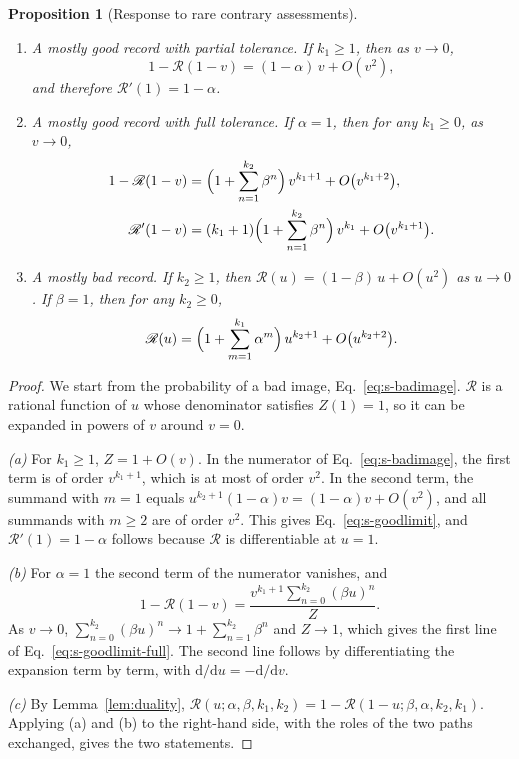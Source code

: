 \documentclass[10pt]{wlscirep}
\newcommand{\Rmap}{\mathscr{R}}            %
\newcommand{\dd}{\mathrm{d}}
\theoremstyle{plain}
\newtheorem{proposition}[lemma]{Proposition}
\theoremstyle{remark}
\begin{document}
\begin{proposition}[Response to rare contrary assessments]\label{prop:properties}
\begin{enumerate}
\item[(a)] \textit{A mostly good record with partial tolerance.} If $k_1\geq1$, then as $v\to0$,
\begin{equation}
1-\Rmap(1-v)=(1-\alpha)\,v+O(v^2),
\label{eq:s-goodlimit}
\end{equation}
and therefore $\Rmap'(1)=1-\alpha$.
\item[(b)] \textit{A mostly good record with full tolerance.} If $\alpha=1$, then for any $k_1\geq0$, as $v\to0$,
\begin{equation}
\begin{aligned}
1-\Rmap(1-v)&=\Bigl(1+\sum_{n=1}^{k_2}\beta^n\Bigr)\,v^{k_1+1}+O\bigl(v^{k_1+2}\bigr),\\
\Rmap'(1-v)&=(k_1+1)\Bigl(1+\sum_{n=1}^{k_2}\beta^n\Bigr)\,v^{k_1}+O\bigl(v^{k_1+1}\bigr).
\end{aligned}
\label{eq:s-goodlimit-full}
\end{equation}
\item[(c)] \textit{A mostly bad record.} If $k_2\geq1$, then $\Rmap(u)=(1-\beta)\,u+O(u^2)$ as $u\to0$. If $\beta=1$, then for any $k_2\geq0$,
\begin{equation}
\Rmap(u)=\Bigl(1+\sum_{m=1}^{k_1}\alpha^m\Bigr)\,u^{k_2+1}+O\bigl(u^{k_2+2}\bigr).
\label{eq:s-badlimit}
\end{equation}
\end{enumerate}
\end{proposition}
\begin{proof}
We start from the probability of a bad image, Eq.~\eqref{eq:s-badimage}. $\Rmap$ is a rational function of $u$ whose denominator satisfies $Z(1)=1$, so it can be expanded in powers of $v$ around $v=0$.

\textit{(a)} For $k_1\geq1$, $Z=1+O(v)$. In the numerator of Eq.~\eqref{eq:s-badimage}, the first term is of order $v^{k_1+1}$, which is at most of order $v^2$. In the second term, the summand with $m=1$ equals $u^{k_2+1}(1-\alpha)v=(1-\alpha)v+O(v^2)$, and all summands with $m\geq2$ are of order $v^2$. This gives Eq.~\eqref{eq:s-goodlimit}, and $\Rmap'(1)=1-\alpha$ follows because $\Rmap$ is differentiable at $u=1$.

\textit{(b)} For $\alpha=1$ the second term of the numerator vanishes, and
\begin{equation}
1-\Rmap(1-v)=\frac{v^{k_1+1}\sum_{n=0}^{k_2}(\beta u)^n}{Z}.
\label{eq:s-fulltolerance}
\end{equation}
As $v\to0$, $\sum_{n=0}^{k_2}(\beta u)^n\to1+\sum_{n=1}^{k_2}\beta^n$ and $Z\to1$, which gives the first line of Eq.~\eqref{eq:s-goodlimit-full}. The second line follows by differentiating the expansion term by term, with $\dd/\dd u=-\dd/\dd v$.

\textit{(c)} By Lemma~\ref{lem:duality}, $\Rmap(u;\alpha,\beta,k_1,k_2)=1-\Rmap(1-u;\beta,\alpha,k_2,k_1)$. Applying (a) and (b) to the right-hand side, with the roles of the two paths exchanged, gives the two statements.
\end{proof}
\end{document}
